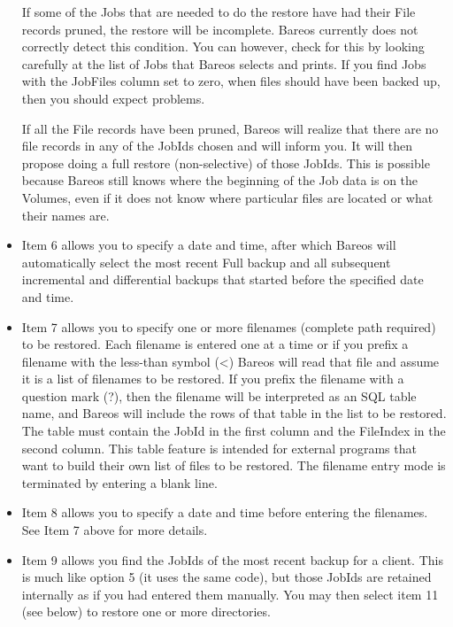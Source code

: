 \begin{itemize}
   If some of the Jobs that are needed to do the restore have had their
   File records pruned, the restore will be incomplete. Bareos currently
   does not correctly detect this condition.  You can however, check for
   this by looking carefully at the list of Jobs that Bareos selects and
   prints. If you find Jobs with the JobFiles column set to zero, when
   files should have been backed up, then you should expect problems.

   If all the File records have been pruned, Bareos will realize that there
   are no file records in any of the JobIds chosen and will inform you. It
   will then propose doing a full restore (non-selective) of those JobIds.
   This is possible because Bareos still knows where the beginning of the
   Job data is on the Volumes, even if it does not know where particular
   files are located or what their names are.

\item Item 6 allows you to specify a date and time, after which Bareos  will
   automatically select the most recent Full backup and all  subsequent
   incremental and differential backups that started  before the specified date
   and time.

\item Item 7 allows you to specify one or more filenames  (complete path
   required) to be restored. Each filename  is entered one at a time or if you
   prefix a filename  with the less-than symbol ({\textless}) Bareos will read that
   file and assume it is a list of filenames to be restored.  If you
   prefix the filename with a question mark (?), then the filename will
   be interpreted as an SQL table name, and Bareos will include the rows
   of that table in the list to be restored. The table must contain the
   JobId in the first column and the FileIndex in the second column.
   This table feature is intended for external programs that want to build
   their own list of files to be restored.
   The filename entry mode is terminated by entering a  blank line.

\item Item 8 allows you to specify a date and time before  entering the
   filenames. See Item 7 above for more  details.

\item Item 9 allows you find the JobIds of the most recent backup for
   a client. This is much like option 5 (it uses the same code), but
   those JobIds are retained internally as if you had entered them
   manually.  You may then select item 11 (see below) to restore one
   or more directories.


\end{itemize}
